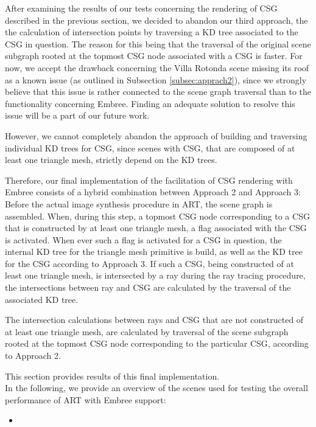 After examining the results of our tests concerning the rendering of CSG described in the previous section, we decided to abandon our third approach, the the calculation of intersection points by traversing a KD tree associated to the CSG in question. The reason for this being that the traversal of the original scene subgraph rooted at the topmost CSG node associated with a CSG is faster. For now, we accept the drawback concerning the Villa Rotonda scene missing its roof as a known issue (as outlined in Subsection \ref{subsec:apprach2}), since we strongly believe that this issue is rather connected to the scene graph traversal than to the functionality concerning Embree. Finding an adequate solution to resolve this issue will be a part of our future work.

However, we cannot completely abandon the approach of building and traversing individual KD trees for CSG, since scenes with CSG, that are composed of at least one triangle mesh, strictly depend on the KD trees.

Therefore, our final implementation of the facilitation of CSG rendering with Embree consists of a hybrid combination between Approach 2 and Approach 3: Before the actual image synthesis procedure in ART, the scene graph is assembled. When, during this step, a topmost CSG node corresponding to a CSG that is constructed by at least one triangle mesh, a flag associated with the CSG is activated. When ever such a flag is activated for a CSG in question, the internal KD tree for the triangle mesh primitive is build, as well as the KD tree for the CSG according to Approach 3. If such a CSG, being constructed of at least one triangle mesh, is intersected by a ray during the ray tracing procedure, the intersections between ray and CSG are calculated by the traversal of the associated KD tree.

The intersection calculations between rays and CSG that are not constructed of at least one triangle mesh, are calculated by traversal of the scene subgraph rooted at the topmost CSG node corresponding to the particular CSG, according to Approach 2.

This section provides results of this final implementation.
\\

\noindent In the following, we provide an overview of the scenes used for testing the overall performance of ART with Embree support:
\begin{itemize}
	\setlength\itemsep{0.05em}
	
	\item 
	
	
\end{itemize}


